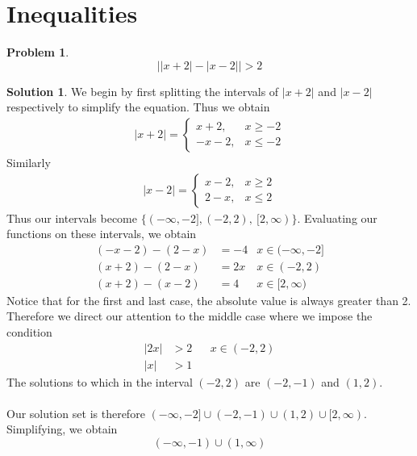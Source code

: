 \documentclass[a4paper]{article}
\theoremstyle{definition}
\newtheorem{problem}{Problem}[section]
\newtheorem*{solution}{Solution}
\begin{document}
\section{Inequalities}
\begin{problem}
\[
\left| |x+2|-|x-2| \right| > 2
\]
\end{problem}
\begin{solution}
We begin by first splitting the intervals of \(|x+2|\) and \(|x-2|\) respectively to simplify the equation. Thus we obtain
\begin{align*}
|x+2| = 
\begin{cases}
    x+2, &x \geq -2 \\
    -x-2, &x \leq -2
\end{cases}
\end{align*}
Similarly
\begin{align*}
|x-2| = 
\begin{cases}
    x-2, &x \geq 2 \\
    2-x, &x \leq 2
\end{cases}
\end{align*}
Thus our intervals become \(\{(-\infty, -2], (-2, 2), \ [2, \infty)\} \).
Evaluating our functions on these intervals, we obtain
\begin{align*}
(-x-2) - (2-x) &= -4 & x \in (-\infty, -2] \\
(x+2) - (2-x) &= 2x & x \in (-2, 2) \\
(x+2) - (x-2) &= 4 & x \in [2, \infty)
\end{align*}
Notice that for the first and last case, the absolute value is always greater than 2. Therefore we direct our attention to the middle case where we impose the condition
\begin{align*}
|2x| &> 2 && x \in (-2, 2) \\
|x| &>  1
\end{align*}
The solutions to which in the interval \((-2, 2)\) are \((-2, -1)\) and \((1, 2)\).
\\ \\
Our solution set is therefore \((-\infty, -2] \cup (-2, -1) \cup (1, 2) \cup [2, \infty)\). Simplifying, we obtain
\[
(-\infty, -1) \cup (1, \infty)
\]



\end{solution}
\end{document}
